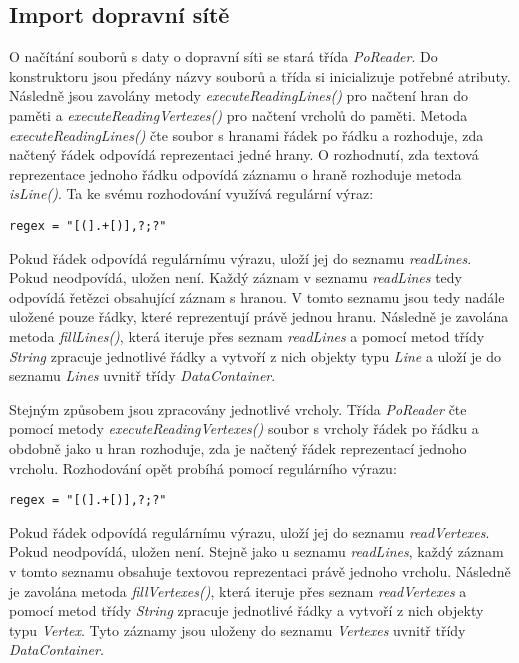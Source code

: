 \subsection{Import dopravní sítě}

O načítání souborů s daty o dopravní síti se stará třída \textit{PoReader}. Do konstruktoru jsou předány názvy souborů a třída si inicializuje potřebné atributy. Následně jsou zavolány metody \textit{executeReadingLines()} pro načtení hran do paměti a \textit{executeReadingVertexes()} pro načtení vrcholů do paměti. Metoda \textit{executeReadingLines()} čte soubor s hranami řádek po řádku a rozhoduje, zda načtený řádek odpovídá reprezentaci jedné hrany. O rozhodnutí, zda textová reprezentace jednoho řádku odpovídá záznamu o hraně rozhoduje metoda \textit{isLine()}. Ta ke svému rozhodování využívá regulární výraz: 

\begin{lstlisting}
regex = "[(].+[)],?;?"
\end{lstlisting}

Pokud řádek odpovídá regulárnímu výrazu, uloží jej do seznamu \textit{readLines}. Pokud neodpovídá, uložen není. Každý záznam v seznamu \textit{readLines} tedy odpovídá řetězci obsahující záznam s hranou. V tomto seznamu jsou tedy nadále uložené pouze řádky, které reprezentují právě jednou hranu. Následně je zavolána metoda \textit{fillLines()}, která iteruje přes seznam \textit{readLines} a pomocí metod třídy \textit{String} zpracuje jednotlivé řádky a vytvoří z nich objekty typu \textit{Line} a uloží je do seznamu \textit{Lines} uvnitř třídy \textit{DataContainer}. 

Stejným způsobem jsou zpracovány jednotlivé vrcholy. Třída \textit{PoReader} čte pomocí metody \textit{executeReadingVertexes()} soubor s vrcholy řádek po řádku a obdobně jako u hran rozhoduje, zda je načtený řádek reprezentací jednoho vrcholu. Rozhodování opět probíhá pomocí regulárního výrazu: 

\begin{lstlisting}
regex = "[(].+[)],?;?"
\end{lstlisting}

Pokud řádek odpovídá regulárnímu výrazu, uloží jej do seznamu \textit{readVertexes}. Pokud neodpovídá, uložen není. Stejně jako u seznamu \textit{readLines}, každý záznam v tomto seznamu obsahuje textovou reprezentaci právě jednoho vrcholu. Následně je zavolána metoda \textit{fillVertexes()}, která iteruje přes seznam \textit{readVertexes} a pomocí metod třídy \textit{String} zpracuje jednotlivé řádky a vytvoří z nich objekty typu \textit{Vertex}. Tyto záznamy jsou uloženy do seznamu \textit{Vertexes} uvnitř třídy \textit{DataContainer}. 

